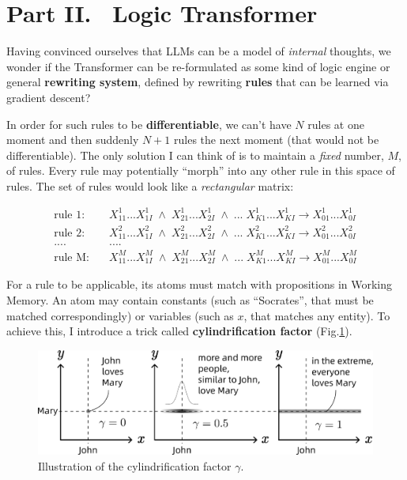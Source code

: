 \documentclass[runningheads]{llncs}
\begin{document}
\section*{Part II. \ Logic Transformer}

Having convinced ourselves that LLMs can be a model of \textit{internal} thoughts, we wonder if the Transformer can be re-formulated as some kind of logic engine or general \textbf{rewriting system}, defined by rewriting \textbf{rules} that can be learned via gradient descent?

In order for such rules to be \textbf{differentiable}, we can't have $N$ rules at one moment and then suddenly $N+1$ rules the next moment (that would not be differentiable).  The only solution I can think of is to maintain a \textit{fixed} number, $M$, of rules.  Every rule may potentially ``morph'' into any other rule in this space of rules.  The set of rules would look like a \textit{rectangular} matrix:

\begin{equation}
\begin{aligned}
\mbox{rule 1:} & \quad \boxed{X^1_{11}... X^1_{1I}} \;\wedge\; \boxed{X^1_{21} ... X^1_{2I}} \;\wedge\;...\; \boxed{X^1_{K1} ... X^1_{KI}} \rightarrow \boxed{X^1_{01} ... X^1_{0I}} \\
\mbox{rule 2:} & \quad \boxed{X^2_{11}... X^2_{1I}} \;\wedge\; \boxed{X^2_{21} ... X^2_{2I}} \;\wedge\;...\; \boxed{X^2_{K1} ... X^2_{KI}} \rightarrow \boxed{X^2_{01} ... X^2_{0I}} \\
.... & \quad .... \\
\mbox{rule M:} & \quad \boxed{X^M_{11}... X^M_{1I}} \;\wedge\; \boxed{X^M_{21} ... X^M_{2I}} \;\wedge\;...\; \boxed{X^M_{K1} ... X^M_{KI}} \rightarrow \boxed{X^M_{01} ... X^M_{0I}}
\end{aligned}
\end{equation}

For a rule to be applicable, its atoms must match with propositions in Working Memory.  An atom may contain constants (such as ``Socrates'', that must be matched correspondingly) or variables (such as $x$, that matches any entity).  To achieve this, I introduce a trick called \textbf{cylindrification factor} (Fig.\ref{fig:cylindrify-example}).

\begin{figure}
	\includegraphics[scale=.6]{cylindrify-example.png}
	\caption{Illustration of the cylindrification factor $\gamma$.}
	\label{fig:cylindrify-example}
\end{figure}
\end{document}
